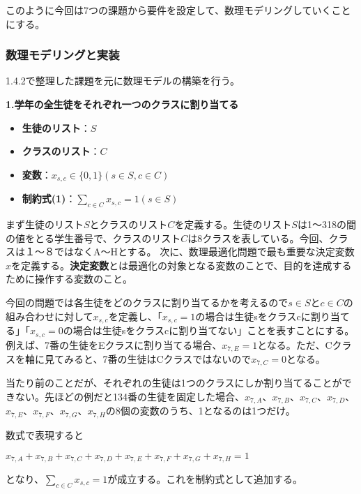 \documentclass{jsarticle}
\begin{document}
このように今回は7つの課題から要件を設定して、数理モデリングしていくことにする。





\newpage

\subsubsection{数理モデリングと実装}
1.4.2で整理した課題を元に数理モデルの構築を行う。

\begin{itembox}[l]{{\bf 1.学年の全生徒をそれぞれ一つのクラスに割り当てる}}
	\begin{itemize}
		\item {\bf 生徒のリスト}：$S$
		\item {\bf クラスのリスト}：$C$
		\item {\bf 変数}：$x_{s,c} \in\{0,1\}　(s \in S, c \in C)$
		\item {\bf 制約式(1)}：${\displaystyle \sum_{c \in C}x_{s,c}=1}　(s \in S)$
	\end{itemize}
\end{itembox}
\par まず生徒のリスト$S$とクラスのリスト$C$を定義する。生徒のリスト$S$は1〜318の間の値をとる学生番号で、クラスのリスト$C$は8クラスを表している。今回、クラスは１〜８ではなくA〜Hとする。
次に、数理最適化問題で最も重要な決定変数$x$を定義する。{\bf 決定変数}とは最適化の対象となる変数のことで、目的を達成するために操作する変数のこと。
\par 今回の問題では各生徒をどのクラスに割り当てるかを考えるので$s \in S$と$c \in C$の組み合わせに対して$x_{s,c}$を定義し、「$x_{s,c}=1$の場合は生徒sをクラスcに割り当てる」「$x_{s,c}=0$の場合は生徒sをクラスcに割り当てない」ことを表すことにする。例えば、7番の生徒をEクラスに割り当てる場合、$x_{7,E}=1$となる。ただ、Cクラスを軸に見てみると、7番の生徒はCクラスではないので$x_{7,C}=0$となる。
\par 当たり前のことだが、それぞれの生徒は1つのクラスにしか割り当てることができない。先ほどの例だと134番の生徒を固定した場合、$x_{7,A}$、$x_{7,B}$、$x_{7,C}$、$x_{7,D}$、$x_{7,E}$、$x_{7,F}$、$x_{7,G}$、$x_{7,H}$の8個の変数のうち、1となるのは1つだけ。
\par 数式で表現すると
\vspace\baselineskip	
\par $x_{7,A}+x_{7,B}+x_{7,C}+x_{7,D}+x_{7,E}+x_{7,F}+x_{7,G}+x_{7,H} = 1$
\vspace\baselineskip	
\par となり、${\displaystyle \sum_{c \in C}x_{s,c}=1}$が成立する。これを制約式として追加する。
\end{document}
